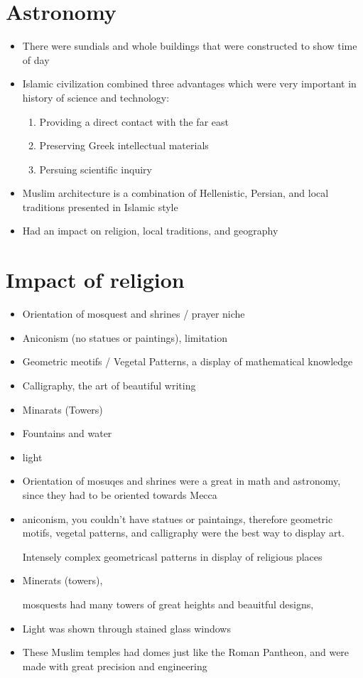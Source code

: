 \documentclass{article}
\begin{document}
\section*{Astronomy}
\begin{itemize}
  \item There were sundials and whole buildings that were constructed
    to show time of day
  \item Islamic civilization combined three advantages which were very important in history
    of science and technology:
    \begin{enumerate}
      \item Providing a direct contact with the far east
      \item Preserving Greek intellectual materials
      \item Persuing scientific inquiry
    \end{enumerate}
  \item Muslim architecture is a combination of
    Hellenistic, Persian, and local traditions presented in Islamic style
  \item Had an impact on religion, local traditions, and geography
\end{itemize}

\section*{Impact of religion}

\begin{itemize}
  \item Orientation of mosquest and shrines / prayer niche
  \item Aniconism (no statues or paintings),
    limitation
  \item Geometric meotifs / Vegetal Patterns,
    a display of mathematical knowledge
  \item Calligraphy,
    the art of beautiful writing
  \item Minarats (Towers)
  \item Fountains and water
  \item light
  \item Orientation of mosuqes and shrines were a great in math
    and astronomy, since they had to be oriented towards Mecca
  \item aniconism, you couldn't have statues or paintaings, therefore
    geometric motifs, vegetal patterns, and calligraphy
    were the best way to display art.

    Intensely complex geometricasl patterns in display of religious places
  \item Minerats (towers),

    mosquests had many towers of great heights and beauitful designs,
  \item Light was shown through stained glass windows
  \item These Muslim temples had domes just like the Roman Pantheon,
    and were made with great precision and engineering
\end{itemize}
\end{document}
